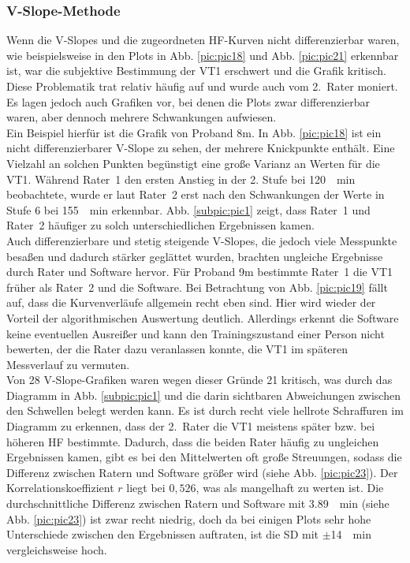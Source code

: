 \subsubsection{V-Slope-Methode}
%
Wenn die V-Slopes und die zugeordneten \gls{HF}-Kurven nicht differenzierbar waren, wie beispielsweise in den Plots in Abb. \ref{pic:pic18} und Abb. \ref{pic:pic21} erkennbar ist, war die subjektive Bestimmung der VT1 erschwert und die Grafik kritisch. Diese Problematik trat relativ häufig auf und wurde auch vom 2.~Rater moniert. Es lagen jedoch auch Grafiken vor, bei denen die Plots zwar differenzierbar waren, aber dennoch mehrere Schwankungen aufwiesen.\\
Ein Beispiel hierfür ist die Grafik von Proband 8m. In Abb. \ref{pic:pic18} ist ein nicht differenzierbarer V-Slope zu sehen, der mehrere Knickpunkte enthält. Eine Vielzahl an solchen Punkten begünstigt eine große Varianz an Werten für die VT1. Während Rater~1 den ersten Anstieg in der 2. Stufe bei \SI{120}{\per\minute} beobachtete, wurde er laut Rater~2 erst nach den Schwankungen der Werte in Stufe 6 bei \SI{155}{\per\minute} erkennbar. Abb. \ref{subpic:pic1} zeigt, dass Rater~1 und Rater~2 häufiger zu solch unterschiedlichen Ergebnissen kamen.\\
Auch differenzierbare und stetig steigende V-Slopes, die jedoch viele Messpunkte besaßen und dadurch stärker geglättet wurden, brachten ungleiche Ergebnisse durch Rater und Software hervor. Für Proband 9m bestimmte Rater~1 die VT1 früher als Rater~2 und die Software. Bei Betrachtung von Abb. \ref{pic:pic19} fällt auf, dass die Kurvenverläufe allgemein recht eben sind. Hier wird wieder der Vorteil der algorithmischen Auswertung deutlich. Allerdings erkennt die Software keine eventuellen Ausreißer und kann den Trainingszustand einer Person nicht bewerten, der die Rater dazu veranlassen konnte, die VT1 im späteren Messverlauf zu vermuten.\\
Von 28 V-Slope-Grafiken waren wegen dieser Gründe 21 kritisch, was durch das Diagramm in Abb. \ref{subpic:pic1} und die darin sichtbaren Abweichungen zwischen den Schwellen belegt werden kann. Es ist durch recht viele hellrote Schraffuren im Diagramm zu erkennen, dass der 2.~Rater die VT1 meistens später bzw. bei höheren \gls{HF} bestimmte. Dadurch, dass die beiden Rater häufig zu ungleichen Ergebnissen kamen, gibt es bei den Mittelwerten oft große Streuungen, sodass die Differenz zwischen Ratern und Software größer wird (siehe Abb. \ref{pic:pic23}). Der Korrelationskoeffizient $r$ liegt bei $0,526$, was als mangelhaft zu werten ist. Die durchschnittliche Differenz zwischen Ratern und Software mit \SI{3,89}{\per\minute} (siehe Abb. \ref{pic:pic23}) ist zwar recht niedrig, doch da bei einigen Plots sehr hohe Unterschiede zwischen den Ergebnissen auftraten, ist die \gls{SD} mit $\pm$\SI{14}{\per\minute} vergleichsweise hoch.
%
